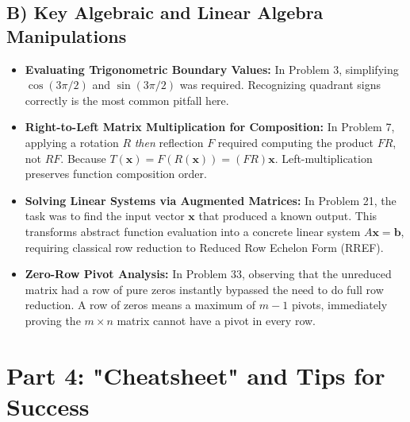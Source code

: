 \documentclass[11pt]{article}
\begin{document}
\subsection{B) Key Algebraic and Linear Algebra Manipulations}
\begin{itemize}
    \item \textbf{Evaluating Trigonometric Boundary Values:} In Problem 3, simplifying $\cos(3\pi/2)$ and $\sin(3\pi/2)$ was required. Recognizing quadrant signs correctly is the most common pitfall here.
    \item \textbf{Right-to-Left Matrix Multiplication for Composition:} In Problem 7, applying a rotation $R$ \textit{then} reflection $F$ required computing the product $FR$, not $RF$. Because $T(\mathbf{x}) = F(R(\mathbf{x})) = (FR)\mathbf{x}$. Left-multiplication preserves function composition order.
    \item \textbf{Solving Linear Systems via Augmented Matrices:} In Problem 21, the task was to find the input vector $\mathbf{x}$ that produced a known output. This transforms abstract function evaluation into a concrete linear system $A\mathbf{x} = \mathbf{b}$, requiring classical row reduction to Reduced Row Echelon Form (RREF).
    \item \textbf{Zero-Row Pivot Analysis:} In Problem 33, observing that the unreduced matrix had a row of pure zeros instantly bypassed the need to do full row reduction. A row of zeros means a maximum of $m-1$ pivots, immediately proving the $m \times n$ matrix cannot have a pivot in every row.
\end{itemize}

\newpage
\section{Part 4: "Cheatsheet" and Tips for Success}
\end{document}
